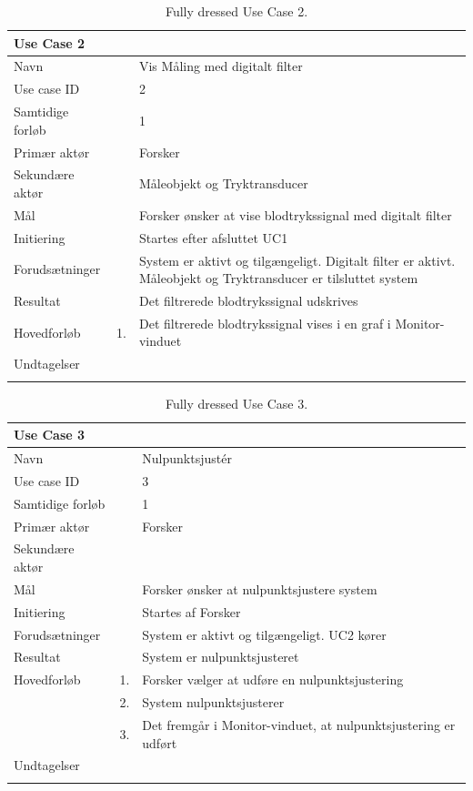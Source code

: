 \begin{longtabu} to  %
    {\large \textbf{Use Case 2}} && \\
    \toprule
    Navn &&    Vis Måling med digitalt filter\\
    Use case ID &&    2\\
    Samtidige forløb &&    1\\
    Primær aktør &&    Forsker\\
    Sekundære aktør &&	 Måleobjekt og Tryktransducer\\
    Mål &&    Forsker ønsker at vise blodtrykssignal med digitalt filter\\
    Initiering &&	Startes efter afsluttet UC1\\
    Forudsætninger &&  System er aktivt og tilgængeligt. Digitalt filter er aktivt. Måleobjekt og Tryktransducer er tilsluttet system\\
    Resultat &&		Det filtrerede blodtrykssignal udskrives                         \\ \midrule
    Hovedforløb &    1. &    Det filtrerede blodtrykssignal vises i en graf i Monitor-vinduet\newline\\ \midrule
                
    Undtagelser &    &   \\ \bottomrule
\caption{Fully dressed Use Case 2.}
\label{UC2}
\end{longtabu}


\begin{longtabu} to  %
    {\large \textbf{Use Case 3}} && \\
    \toprule
    Navn &&    Nulpunktsjustér\\
    Use case ID &&    3\\
    Samtidige forløb &&    1\\
    Primær aktør &&    Forsker\\
    Sekundære aktør && \\
    Mål &&    Forsker ønsker at nulpunktsjustere system\\
    Initiering &&	Startes af Forsker\\
    Forudsætninger &&  System er aktivt og tilgængeligt. UC2 kører \\    
    Resultat &&		System er nulpunktsjusteret\\ \midrule
    Hovedforløb &    1. &    Forsker vælger at udføre en nulpunktsjustering\\[-1ex]   						 	
                &    2. &    System nulpunktsjusterer\\[-1ex]
                &	 3.	&	 Det fremgår i Monitor-vinduet, at nulpunktsjustering er udført\newline\\ \midrule
                
    Undtagelser &     &      \\ \bottomrule
\caption{Fully dressed Use Case 3.}
\label{UC3}
\end{longtabu}

